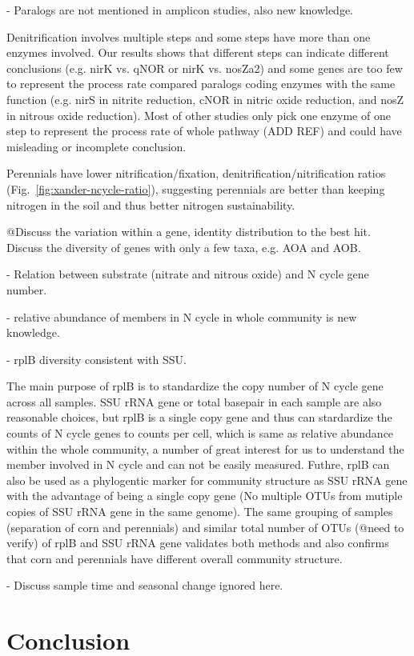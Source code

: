 \documentclass[12pt]{article}
\begin{document}
- Paralogs are not mentioned in amplicon studies, also new knowledge.

Denitrification involves multiple steps and some steps have more than one enzymes involved.  Our results shows that different steps can indicate different conclusions (e.g. nirK vs. qNOR or nirK vs. nosZa2) and some genes are too few to represent the process rate compared paralogs coding enzymes with the same function (e.g. nirS in nitrite reduction, cNOR in nitric oxide reduction, and nosZ in nitrous oxide reduction). Most of other studies only pick one enzyme of one step to represent the process rate of whole pathway (ADD REF) and could have misleading or incomplete conclusion.

Perennials have lower nitrification/fixation, denitrification/nitrification ratios (Fig.~\ref{fig:xander-ncycle-ratio}), suggesting perennials are better than keeping nitrogen in the soil and thus better nitrogen sustainability.

@Discuss the variation within a gene, identity distribution to the best hit. Discuss the diversity of genes with only a few taxa, e.g. AOA and AOB.

- Relation between substrate (nitrate and nitrous oxide) and N cycle gene number. 

- relative abundance of members in N cycle in whole community is new knowledge.

- rplB diversity consistent with SSU. 

The main purpose of rplB is to standardize the copy number of N cycle gene across all samples. SSU rRNA gene or total basepair in each sample are also reasonable choices, but rplB is a single copy gene and thus can stardardize the counts of N cycle genes to counts per cell, which is same as relative abundance within the whole community, a number of great interest for us to understand the member involved in N cycle and can not be easily measured. Futhre, rplB can also be used as a phylogentic marker for community structure as SSU rRNA gene with the advantage of being a single copy gene (No multiple OTUs from mutiple copies of SSU rRNA gene in the same genome). The same grouping of samples (separation of corn and perennials) and similar total number of OTUs (@need to verify) of rplB and SSU rRNA gene validates both methods and also confirms that corn and perennials have different overall community structure.

- Discuss sample time and seasonal change ignored here. 

\section{Conclusion}
\end{document}
